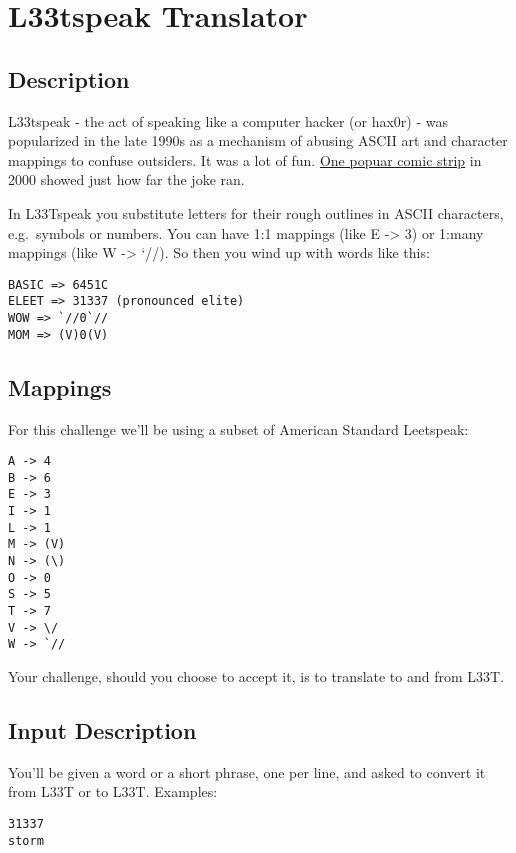 \section{L33tspeak Translator}

\subsection*{Description}\label{description-30}

L33tspeak - the act of speaking like a computer hacker (or hax0r) - was
popularized in the late 1990s as a mechanism of abusing ASCII art and
character mappings to confuse outsiders. It was a lot of fun.
\href{http://megatokyo.com/strip/9}{One popuar comic strip} in 2000
showed just how far the joke ran.

In L33Tspeak you substitute letters for their rough outlines in ASCII
characters, e.g.~symbols or numbers. You can have 1:1 mappings (like E
-\textgreater{} 3) or 1:many mappings (like W -\textgreater{} `//). So
then you wind up with words like this:

\begin{lstlisting}
BASIC => 6451C
ELEET => 31337 (pronounced elite)
WOW => `//0`//
MOM => (V)0(V)
\end{lstlisting}

\subsection*{Mappings}\label{mappings}

For this challenge we'll be using a subset of American Standard
Leetspeak:

\begin{lstlisting}
A -> 4
B -> 6
E -> 3
I -> 1
L -> 1
M -> (V)
N -> (\)
O -> 0
S -> 5
T -> 7
V -> \/
W -> `//
\end{lstlisting}

Your challenge, should you choose to accept it, is to translate to and
from L33T.

\subsection*{Input Description}\label{input-description-22}

You'll be given a word or a short phrase, one per line, and asked to
convert it from L33T or to L33T. Examples:

\begin{lstlisting}
31337 
storm 
\end{lstlisting}

